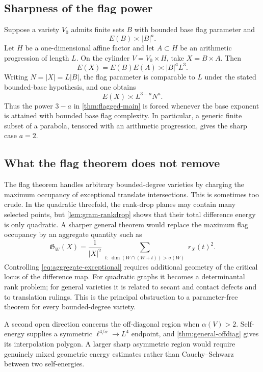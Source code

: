 \documentclass[11pt]{amsart}
\numberwithin{equation}{section}
\theoremstyle{definition}
\theoremstyle{remark}
\newcommand{\1}{\mathbf 1}
\newcommand{\card}[1]{\lvert #1\rvert}
\begin{document}
\subsection{Sharpness of the flag power}
Suppose a variety $V_0$ admits finite sets $B$ with bounded base flag parameter and
\[
 E(B)\asymp\card B^a.
\]
Let $H$ be a one-dimensional affine factor and let $A\subset H$ be an arithmetic progression of length $L$.  On the cylinder $V=V_0\times H$, take $X=B\times A$.  Then
\[
 E(X)=E(B)E(A)\asymp\card B^aL^3.
\]
Writing $N=\card X=L\card B$, the flag parameter is comparable to $L$ under the stated bounded-base hypothesis, and one obtains
\begin{equation}\label{eq:flag-sharp}
 E(X)\asymp L^{3-a}N^a.
\end{equation}
Thus the power $3-a$ in \cref{thm:flagged-main} is forced whenever the base exponent is attained with bounded base flag complexity.  In particular, a generic finite subset of a parabola, tensored with an arithmetic progression, gives the sharp case $a=2$.

\subsection{What the flag theorem does not remove}
The flag theorem handles arbitrary bounded-degree varieties by charging the maximum occupancy of exceptional translate intersections.  This is sometimes too crude.  In the quadratic threefold, the rank-drop planes may contain many selected points, but \cref{lem:gram-rankdrop} shows that their total difference energy is only quadratic.  A sharper general theorem would replace the maximum flag occupancy by an aggregate quantity such as
\begin{equation}\label{eq:aggregate-exceptional}
 \mathfrak G_W(X)
 =\frac1{\card X^2}
 \sum_{\substack{t:\ \dim(W\cap(W+t))>\sigma(W)}}r_X(t)^2.
\end{equation}
Controlling \eqref{eq:aggregate-exceptional} requires additional geometry of the critical locus of the difference map.  For quadratic graphs it becomes a determinantal rank problem; for general varieties it is related to secant and contact defects and to translation rulings.  This is the principal obstruction to a parameter-free theorem for every bounded-degree variety.

A second open direction concerns the off-diagonal region when $\alpha(V)>2$.  Self-energy supplies a symmetric $\ell^{4/\alpha}\to L^4$ endpoint, and \cref{thm:general-offdiag} gives its interpolation polygon.  A larger sharp asymmetric region would require genuinely mixed geometric energy estimates rather than Cauchy--Schwarz between two self-energies.
\end{document}
